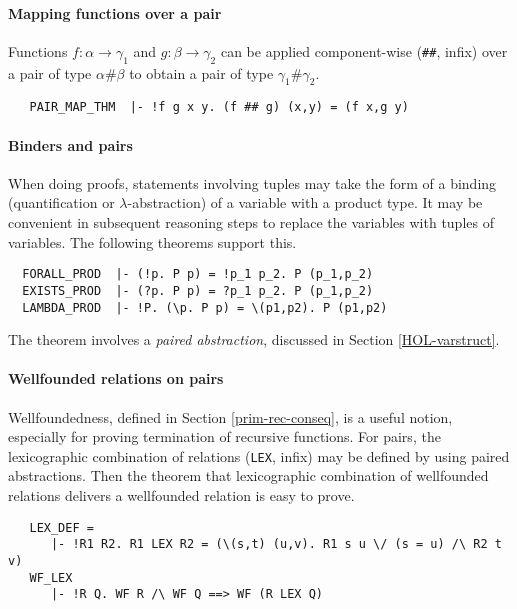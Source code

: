 \paragraph {Mapping functions over a pair}

Functions $f : \alpha \to \gamma_1$ and $g : \beta\to\gamma_2$ can be
applied component-wise ({\small\verb+##+}, infix) over a pair of type
$\alpha \# \beta$ to obtain a pair of type $\gamma_1 \# \gamma_2$.
%
\begin{hol}
\begin{verbatim}
   PAIR_MAP_THM  |- !f g x y. (f ## g) (x,y) = (f x,g y)
\end{verbatim}
\end{hol}

\paragraph {Binders and pairs}

When doing proofs, statements involving tuples may take the form of a
binding (quantification or $\lambda$-abstraction) of a variable with a
product type. It may be convenient in subsequent reasoning steps to
replace the variables with tuples of variables. The following theorems
support this.
%
\begin{hol}
\begin{verbatim}
  FORALL_PROD  |- (!p. P p) = !p_1 p_2. P (p_1,p_2)
  EXISTS_PROD  |- (?p. P p) = ?p_1 p_2. P (p_1,p_2)
  LAMBDA_PROD  |- !P. (\p. P p) = \(p1,p2). P (p1,p2)
\end{verbatim}
\end{hol}
%
The theorem  involves a \emph{paired
 abstraction}, discussed in Section \ref{HOL-varstruct}.


\paragraph {Wellfounded relations on pairs}

Wellfoundedness, defined in Section \ref{prim-rec-conseq},
is a useful notion, especially for proving termination of
recursive functions. For pairs, the lexicographic combination
of relations ({\small\verb+LEX+}, infix) may be defined by using
paired abstractions. Then the theorem that lexicographic combination
of wellfounded relations delivers a wellfounded relation is easy to
prove.
%
\begin{hol}
\begin{verbatim}
   LEX_DEF =
      |- !R1 R2. R1 LEX R2 = (\(s,t) (u,v). R1 s u \/ (s = u) /\ R2 t v)
   WF_LEX
      |- !R Q. WF R /\ WF Q ==> WF (R LEX Q)
\end{verbatim}
\end{hol}

